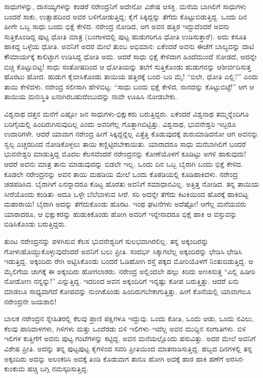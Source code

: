 ಸಾಧುಗಳನ್ನು, ದಾಸಯ್ಯಗಳನ್ನು ಕಂಡರೆ ನರೇಂದ್ರನಿಗೆ ಅದೇನೋ ವಿಶೇಷ ಆಸಕ್ತಿ. ಮನೆಯ ಬಾಗಿಲಿಗೆ ಸಾಧುಗಳು ಬಂದರೆ ಸಾಕು, ಉತ್ಸಾಹದಿಂದ ಅವರ ಬಳಿಗೋಡುತ್ತಿದ್ದ; ಕೈಗೆ ಸಿಕ್ಕಿದ್ದನ್ನು ತೆಗೆದು ಕೊಟ್ಟುಬಿಡುತ್ತಿದ್ದ. ಒಂದು ದಿನ ಹೀಗೇ ಒಬ್ಬ ಸಾಧು ಬಂದು ಭಿಕ್ಷೆ ಕೇಳಿದ. ನರೇಂದ್ರ ನೋಡಿದ, ಆಗ ಅವನ ಹತ್ತಿರ ಇದ್ದುದೆಂದರೆ ಅವನು ಸುತ್ತಿಕೊಂಡಿದ್ದ ಪುಟ್ಟ ಧೋತಿ ಮಾತ್ರ (ಬಂಗಾಳದಲ್ಲಿ ಪುಟ್ಟ ಹುಡುಗರಿಗೂ ಧೋತಿ ಉಡಿಸುತ್ತಾರೆ). ಅದು ಕಸೂತಿ ಹಾಕಿದ್ದ ಒಳ್ಳೆಯ ಧೋತಿ. ಅವನಿಗೆ ಅದರ ಮೇಲೆ ತುಂಬ ಅಭಿಮಾನ: ಏಕೆಂದರೆ ಅವನು ಈಚೆಗೆ ಬಾಲ್ಯವನ್ನು ದಾಟಿ ಕೌಮಾರ್ಯಕ್ಕೆ ಕಾಲಿಟ್ಟಾಗ ಉಡಿಸಿದ್ದ ಧೋತಿ ಅದು. ಆದರೆ ಸಾಧು ಭಿಕ್ಷೆ ಕೇಳಿದಾಗ ಹಿಂದೆಮುಂದೆ ನೋಡದೆ, ಅದನ್ನೇ ಬಿಚ್ಚಿ ಕೊಟ್ಟುಬಿಟ್ಟ! ಸಾಧು ಸಂತೋಷದಿಂದ ಆ ಧೋತಿಯನ್ನು ತಲೆಗೆ ಸುತ್ತಿಕೊಂಡು ಹುಡುಗನನ್ನು ಆಶೀರ್ವದಿಸುತ್ತ ಹೊರಟು ಹೋದ. ಹುಡುಗ ಕೈಬೀಸಿಕೊಂಡು ತಾಯಿಯ ಹತ್ತಿರಕ್ಕೆ ಬಂದ–ಬರಿ ಮೈ! “ಬಿಲೇ, ಧೋತಿ ಎಲ್ಲಿ?” ಎಂದು ತಾಯಿ ಕೇಳಿದಳು. ನರೇಂದ್ರ ಸಲೀಸಾಗಿ ಹೇಳಿಬಿಟ್ಟ: “ಸಾಧು ಬಂದು ಭಿಕ್ಷೆ ಕೇಳಿದ, ನಾನದನ್ನು ಕೊಟ್ಟುಬಿಟ್ಟೆ!” ಆಗ ಆ ತಾಯಿಯ ಮನಃಸ್ಥಿತಿ ಏನಾಗಿರಬಹುದೆಂಬುದನ್ನು ನಾವೇ ಊಹಿಸಿ ನೋಡಬೇಕು.

ವಿಶ್ವನಾಥ ದತ್ತನ ಮನೆಗೆ ಎಷ್ಟೋ ಜನ ಸಾಧುಗಳು-ಭಿಕ್ಷುಕರು ಬರುತ್ತಿದ್ದರು. ಏಕೆಂದರೆ ವಿಶ್ವನಾಥ ತಮ್ಮನ್ನೆಂದಿಗೂ ಬರಿಗೈಯಲ್ಲಿ ಹಿಂದಿರುಗಿಸುವುದಿಲ್ಲ ಎಂದು ಅವರಿಗೆಲ್ಲ ಗೊತ್ತಾಗಿಬಿಟ್ಟಿತ್ತು. ವಿಶ್ವನಾಥ, ಭುವನೇಶ್ವರಿ ಇಬ್ಬರೂ ಉದಾರಿಗಳೇ. ಆದರೆ ಯಾವಾಗ ನರೇಂದ್ರ ಹೀಗೆ ಸಿಕ್ಕಿದ್ದನ್ನೆಲ್ಲ ಎತ್ತೆತ್ತಿ ಕೊಡುವುದಕ್ಕೆ ಶುರುಮಾಡಿದನೋ ಆಗ ಅವನನ್ನು ಸ್ವಲ್ಪ ಎಚ್ಚರದಿಂದ ನೋಡಿಕೊಳ್ಳಲು ತಾಯಿ ಕಣ್ಣಿಟ್ಟಿರಬೇಕಾಯಿತು. ಯಾರಾದರೂ ಸಾಧು ಮನೆಬಾಗಿಲಿಗೆ ಬಂದರೆ ಭುವನೇಶ್ವರಿ ಮಾಡುತ್ತಿದ್ದ ಮೊದಲ ಕೆಲಸವೆಂದರೆ ನರೇಂದ್ರನನ್ನು ಕೋಣೆಯೊಳಗೆ ಕೂಡಿಟ್ಟು ಅಗಳಿ ಹಾಕುವುದು! ಆದರೆ ಅವನು ಮಾತ್ರ ತಾನು ಮಾಡುವುದನ್ನು ಬಿಡಲೇ ಇಲ್ಲ. ಒಂದು ದಿನ ಒಬ್ಬ ಬೈರಾಗಿ ಬಂದು ಭಿಕ್ಷೆ ಕೇಳಿದ. ಕೂಡಲೇ ನರೇಂದ್ರನನ್ನು ಅವನ ತಾಯಿ ಮಹಡಿಯ ಮೇಲೆ ಒಂದು ಕೊಠಡಿಯಲ್ಲಿ ಕೂಡಿಹಾಕಿದಳು. ನರೇಂದ್ರ ಚಡಪಡಿಸಿದ. ಬೈರಾಗಿಗೆ ಏನನ್ನಾದರೂ ಕೊಟ್ಟ ಹೊರತು ಅವನಿಗೆ ಸಮಾಧಾನವಿಲ್ಲ. ಅತ್ತಿತ್ತ ನೋಡಿದ. ತನ್ನ ತಾಯಿಯ ಸೀರೆಯೊಂದು ಕಂಡಿತು–ಅದೂ ಒಳ್ಳೇ ಬೆಲೆಬಾಳುವ ಸೀರೆ. ಸರಿ ಅದನ್ನೇ ತೆಗೆದು ಕಿಟಕಿಯಿಂದ ಹೊರಕ್ಕೆ ಹಾಕಿಬಿಟ್ಟ ಮಹಾರಾಯ! ಬೈರಾಗಿ ಅದನ್ನು ತೆಗೆದುಕೊಂಡು ಹೊರಟ. ಇಂಥ ಘಟನೆಗಳು ಅದೆಷ್ಟೋ! ಆಗೆಲ್ಲ ಮನೆಯವರು ಯಾರಾದರೂ, ಆ ಭಿಕ್ಷುಕರನ್ನು ಹುಡುಕಿಕೊಂಡು ಹೋಗಿ ಅವರಿಗೆ ಇನ್ನೇನಾದರೂ ಭಿಕ್ಷೆ ಹಾಕಿ ಆ ವಸ್ತುವನ್ನು ಬಿಡಿಸಿಕೊಂಡು ಬರುತ್ತಿದ್ದರು.

ತುಂಟ ನರೇಂದ್ರನನ್ನು ಪಳಗಿಸುವ ಕೆಲಸ ಭುವನೇಶ್ವರಿಗೆ ಸುಲಭವಾಗಿರಲಿಲ್ಲ. ತನ್ನ ಅಕ್ಕಂದಿರನ್ನು ಗೋಳುಹೊಯ್ದುಕೊಳ್ಳುವುದೆಂದರೆ ಅವನಿಗೆ ಬಲು ಪ್ರೀತಿ. ಸಂದರ್ಭ ಸಿಕ್ಕಾಗಲೆಲ್ಲ ಅಕ್ಕಂದಿರನ್ನು ಛೇಡಿಸಿ ಛೇಡಿಸಿ ಇಡುತ್ತಿದ್ದ. ಅಕ್ಕಂದಿರು ರೇಗಿ ಅಟ್ಟಿಸಿಕೊಂಡು ಬಂದರೆ ಓಡಿಹೋಗಿ ರಸ್ತೆ ಪಕ್ಕದ ಮೋರಿಯೊಳಗೆ ನಿಂತುಬಿಡುತ್ತಿದ್ದ. ಆ ಮೈಲಿಗೆಯ ಜಾಗಕ್ಕೆ ಈ ಅಕ್ಕಂದಿರು ಹೋಗಲಾರರು. ನರೇಂದ್ರ ಅಲ್ಲಿಂದಲೇ ಹಲ್ಲು ಕಿರಿದು ಅಣಕಿಸುತ್ತ “ಎಲ್ಲಿ ಹಿಡೀರಿ ನೋಡೋಣ ನನ್ನನ್ನು!” ಎನ್ನುತ್ತಿದ್ದ. ಇದರಿಂದ ಅವನ ಅಕ್ಕಂದಿರಿಗೆ ಇನ್ನಷ್ಟು ಕೋಪ ಬರುತ್ತಿತ್ತು. ಆದರೆ ಏನು ಮಾಡಲೂ ಸಾಧ್ಯವಾಗದೆ ಕೋಪವನ್ನು ನುಂಗಿಕೊಂಡು ಹಿಂದಿರುಗಬೇಕಾಗುತ್ತಿತ್ತು. ಹೀಗೆ ಕೊನೆಯಲ್ಲಿ ಯಾವಾಗಲೂ ನರೇಂದ್ರನೇ ಜಯಶಾಲಿ!

ಬಾಲಕ ನರೇಂದ್ರನ ಸ್ನೇಹಿತರಲ್ಲಿ ಕೆಲವು ಪ್ರಾಣಿ ಪಕ್ಷಿಗಳೂ ಇದ್ದುವು. ಒಂದು ಕೋತಿ, ಒಂದು ಆಡು, ಒಂದು ನವಿಲು, ಕೆಲವು ಪಾರಿವಾಳಗಳು, ಗಿಳಿಗಳು ಮತ್ತು ಒಂದೆರಡು ಬಿಳಿ ಇಲಿಗಳು–ಇವೆಲ್ಲ ಅವನ ಮುದ್ದಿನ ಸಂಗಾತಿಗಳು. ಬಿಳಿ ಇಲಿಗಳ ಕುತ್ತಿಗೆಗೆ ಅವನು ಪುಟ್ಟ ಗಂಟೆಗಳನ್ನು ಕಟ್ಟಿದ್ದ. ಅವನ ಮನೆಯಲ್ಲೊಂದು ಹಸುವಿತ್ತು. ಅದರ ಮೇಲೆ ಅವನಿಗೆ ವಿಶೇಷ ಪ್ರೀತಿ. ಅದನ್ನು ತನ್ನ ಪುಟ್ಟಪುಟ್ಟ ಕೈಗಳಿಂದ ಸವರಿ ಪ್ರೀತಿಯಿಂದ ಮಾತನಾಡಿಸುತ್ತಿದ್ದ. ಹಬ್ಬದ ದಿನಗಳಲ್ಲಿ ತನ್ನ ಅಕ್ಕಂದಿರು ಅದನ್ನು ಅಲಂಕರಿಸಿ ಅದಕ್ಕೆ ತಿಂಡಿ ಕೊಡುವಾಗ ತಾನೂ ಹೋಗಿ ಅದಕ್ಕೆ ಹಾರ ಹಾಕಿ ಹಣೆಗೆ ಅರಸಿನ-ಕುಂಕುಮ ಹಚ್ಚಿ ಬಗ್ಗಿ ನಮಸ್ಕರಿಸುತ್ತಿದ್ದ.

